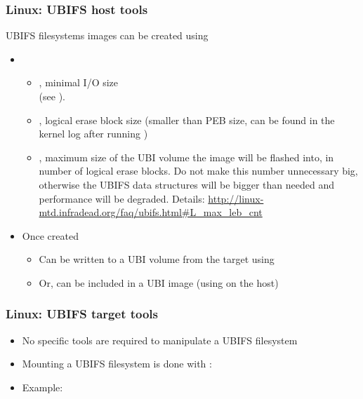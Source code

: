 \begin{frame}
  \frametitle{Linux: UBIFS host tools}
  UBIFS filesystems images can be created using 
    \begin{itemize}
    \item {}
      \begin{itemize}
      \item {}, minimal I/O size\\
                 (see ).
      \item {}, logical erase block size (smaller than
                 PEB size, can be found in the kernel log after running
 		 )
      \item {}, maximum size of the UBI volume the image
        will be flashed into, in number of logical erase blocks.
        Do not make this number unnecessary big, otherwise the UBIFS
        data structures will be bigger than needed and performance
        will be degraded. Details:
        {\scriptsize\url{http://linux-mtd.infradead.org/faq/ubifs.html\#L_max_leb_cnt}}
      \end{itemize}
    \item Once created
      \begin{itemize}
      \item Can be written to a UBI volume from the target using
      \item Or, can be included in a UBI image (using 
        on the host)
      \end{itemize}
    \end{itemize}
\end{frame}

\begin{frame}
  \frametitle{Linux: UBIFS target tools}
  \begin{itemize}
  \item No specific tools are required to manipulate a UBIFS filesystem
  \item Mounting a UBIFS filesystem is done with :\\
  \item Example:\\
  \end{itemize}
\end{frame}

